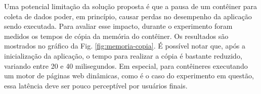 %
%
%

Uma potencial limitação da solução proposta é que a pausa de um contêiner para coleta de dados poder, em princípio, causar perdas no desempenho da aplicação sendo executada. 
%
Para avaliar esse impacto, durante o experimento foram medidos os tempos de cópia da memória do contêiner.
%
Os resultados são mostrados no gráfico da Fig. \ref{fig:memoria-copia}.
%
É possível notar que, após a inicialização da aplicação, o tempo para realizar a cópia é bastante reduzido, variando entre 20 e 40 milisegundos. 
%
Em especial, para contêineres executando um motor de páginas web dinâmicas, como é o caso do experimento em questão, essa latência deve ser pouco perceptível por usuários finais.


%

